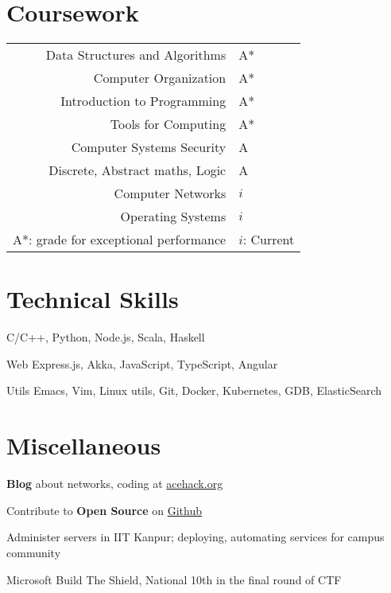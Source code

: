 \documentclass{tccv}
\begin{document}
\vspace{-0.6cm}
\section{Coursework}
\begin{tabularx}{\linewidth}{ r l }
  Data Structures and Algorithms & A*\\
  Computer Organization & A*\\
  Introduction to Programming & A*\\
  Tools for Computing & A*\\
  Computer Systems Security & A\\
  Discrete, Abstract maths, Logic & A\\
  Computer Networks & $i$\\
  Operating Systems & $i$\\
  \footnotesize{A*: grade for exceptional
    performance}&\footnotesize{$i$: Current}\\
\end{tabularx}

\vspace{-0.4cm}
\section{Technical Skills}

C/C++, Python, Node.js, Scala, Haskell

\vspace{0.2cm}
\begin{factlist}

\item{\small{Web}}
  {Express.js, Akka, JavaScript, TypeScript, Angular}


\item {\small{Utils}}
  {Emacs, Vim, Linux utils, Git, Docker,
    Kubernetes, GDB, ElasticSearch}

\end{factlist}

\vspace{-0.6cm}
\section{Miscellaneous}
\vspace{0.2cm}
\begin{thinitemize}
\item \textbf{Blog} about networks, coding at \href{http://acehack.org}{acehack.org}
\item Contribute to \textbf{Open Source}
  on \href{https://github.com/sakshamsharma}{Github}
\item Administer servers in IIT Kanpur; deploying,
  automating services for campus community
\item Microsoft Build The Shield, National 10th in the final round of CTF
\end{thinitemize}
\end{document}
